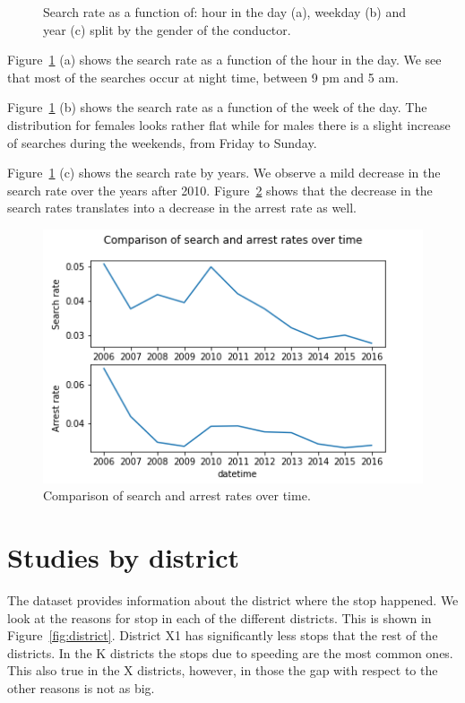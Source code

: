 \documentclass{article}
\begin{document}
\begin{figure}[h]
\caption{Search rate as a function of: hour in the day (a), weekday (b) and year (c) split by the gender of the conductor.} \label{fig:time_studies}
\end{figure}   
\FloatBarrier

Figure~\ref{fig:time_studies} (a) shows the search rate as a function of the hour in the day. We see that most of the searches occur at night time, between 9 pm and 5 am. 

Figure~\ref{fig:time_studies} (b) shows the search rate as a function of the week of the day. The distribution for females looks rather flat while for males there is a slight increase of searches during the weekends, from Friday to Sunday.

 Figure~\ref{fig:time_studies} (c) shows the search rate by years. We observe a mild decrease in the search rate over the years after 2010. Figure~\ref{fig:arrest_search} shows that the decrease in the search rates translates into a decrease in the arrest rate as well. 

 \begin{figure}[h]
 \centering
\includegraphics[scale=0.4, valign=t]{../figures/arrest_search.png}
\caption{Comparison of search and arrest rates over time.} \label{fig:arrest_search}
\end{figure}   
\FloatBarrier


\section{Studies by district}

The dataset provides information about the district where the stop happened. We look at the reasons for stop in each of the different districts. This is shown in Figure~\ref{fig:district}. District X1 has significantly less stops that the rest of the districts. In the K districts the stops due to speeding are the most common ones. This also true in the X districts, however, in those the gap with respect to the other reasons is not as big. 
\end{document}
